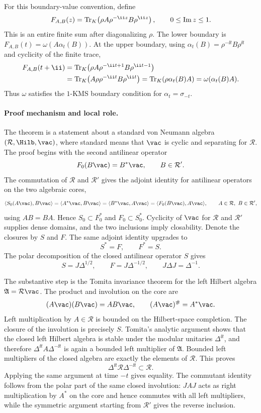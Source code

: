 For this boundary-value convention, define
\[
  F_{A,B}(z)
  =
  {\rm Tr}_K\!\left(\rho A\rho^{-\ii z}B\rho^{\ii z}\right),
  \qquad 0\leq{\rm Im}\,z\leq1 .
\]
This is an entire finite sum after diagonalizing \(\rho\).  The lower
boundary is \(F_{A,B}(t)=\omega(A\alpha_t(B))\).  At the upper boundary,
using \(\alpha_t(B)=\rho^{-\ii t}B\rho^{\ii t}\) and cyclicity of the finite
trace,
\[
\begin{aligned}
  F_{A,B}(t+\ii)
  &=
  {\rm Tr}_K\!\left(\rho A\rho^{-\ii t+1}B\rho^{\ii t-1}\right)  \\
  &=
  {\rm Tr}_K\!\left(A\rho\rho^{-\ii t}B\rho^{\ii t}\right)
  =
  {\rm Tr}_K\!\left(\rho\alpha_t(B)A\right)
  =
  \omega(\alpha_t(B)A).
\end{aligned}
\]
Thus \(\omega\) satisfies the \(1\)-KMS boundary condition for
\(\alpha_t=\sigma_{-t}\).

\paragraph{Proof mechanism and local role.}
The theorem is a statement about a standard von Neumann algebra
\((\mathcal R,\Hilb,\vac)\), where standard means that \(\vac\) is cyclic and
separating for \(\mathcal R\).  The proof begins with the second antilinear
operator
\[
  F_0(B\vac)=B^*\vac,\qquad B\in\mathcal R' .
\]
The commutation of \(\mathcal R\) and \(\mathcal R'\) gives the adjoint
identity for antilinear operators on the two algebraic cores,
\[
  \langle S_0(A\vac),B\vac\rangle
  =
  \langle A^*\vac,B\vac\rangle
  =
  \langle B^*\vac,A\vac\rangle
  =
  \langle F_0(B\vac),A\vac\rangle ,
  \qquad A\in\mathcal R,\ B\in\mathcal R' ,
\]
using \(AB=BA\).  Hence \(S_0\subset F_0^*\) and \(F_0\subset S_0^*\).
Cyclicity of \(\vac\) for \(\mathcal R\) and \(\mathcal R'\) supplies dense
domains, and the two inclusions imply closability.  Denote the closures by
\(S\) and \(F\).  The same adjoint identity upgrades to
\[
  S^*=F,\qquad F^*=S .
\]
The polar decomposition of the closed antilinear operator \(S\) gives
\[
  S=J\Delta^{1/2},
  \qquad
  F=J\Delta^{-1/2},
  \qquad
  J\Delta J=\Delta^{-1}.
\]

The substantive step is the Tomita invariance theorem for the left Hilbert
algebra \(\mathfrak A=\mathcal R\vac\).  The product and involution on the
core are
\[
  (A\vac)(B\vac)=AB\vac,\qquad
  (A\vac)^\#=A^*\vac .
\]
Left multiplication by \(A\in\mathcal R\) is bounded on the Hilbert-space
completion.  The closure of the involution is precisely \(S\).  Tomita's
analytic argument shows that the closed left Hilbert algebra is stable under
the modular unitaries \(\Delta^{\ii t}\), and therefore
\(\Delta^{\ii t}A\Delta^{-\ii t}\) is again a bounded left multiplier of
\(\mathfrak A\).  Bounded left multipliers of the closed algebra are exactly
the elements of \(\mathcal R\).  This proves
\[
  \Delta^{\ii t}\mathcal R\Delta^{-\ii t}\subset \mathcal R .
\]
Applying the same argument at time \(-t\) gives equality.  The commutant
identity follows from the polar part of the same closed involution: \(J A J\)
acts as right multiplication by \(A^*\) on the core and hence commutes with
all left multipliers, while the symmetric argument starting from
\(\mathcal R'\) gives the reverse inclusion.

